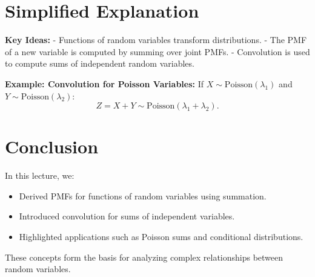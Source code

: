 \documentclass{article}
\begin{document}
\section*{Simplified Explanation}

\textbf{Key Ideas:}
- Functions of random variables transform distributions.
- The PMF of a new variable is computed by summing over joint PMFs.
- Convolution is used to compute sums of independent random variables.

\textbf{Example: Convolution for Poisson Variables:}
If $X \sim \text{Poisson}(\lambda_1)$ and $Y \sim \text{Poisson}(\lambda_2)$:
\[
  Z = X + Y \sim \text{Poisson}(\lambda_1 + \lambda_2).
\]

\section*{Conclusion}

In this lecture, we:
\begin{itemize}
  \item Derived PMFs for functions of random variables using summation.
  \item Introduced convolution for sums of independent variables.
  \item Highlighted applications such as Poisson sums and conditional distributions.
\end{itemize}

These concepts form the basis for analyzing complex relationships between random variables.
\end{document}
